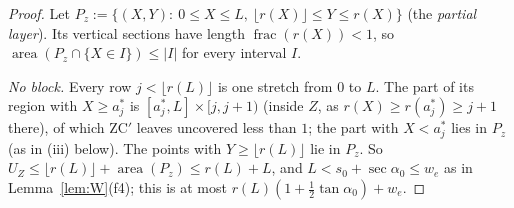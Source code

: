 \documentclass[11pt]{amsart}
\newcommand{\taz}{\tan\alpha_0}
\newcommand{\sez}{\sec\alpha_0}
\theoremstyle{definition}
\theoremstyle{remark}
\numberwithin{equation}{section}
\begin{document}
\begin{proof}
Let $P_z:=\{(X,Y):\ 0\le X\le L,\ \lfloor r(X)\rfloor\le Y\le r(X)\}$ (the \emph{partial layer}). Its vertical sections
have length $\operatorname{frac}(r(X))<1$, so $\operatorname{area}(P_z\cap\{X\in I\})\le|I|$ for every interval $I$.

\emph{No block.} Every row $j<\lfloor r(L)\rfloor$ is one stretch from $0$ to $L$. The part of its region with
$X\ge a_j^*$ is $[a_j^*,L]\times[j,j+1)$ (inside $Z$, as $r(X)\ge r(a_j^*)\ge j+1$ there), of which ZC$'$ leaves
uncovered less than $1$; the part with $X<a_j^*$ lies in $P_z$ (as in (iii) below). The points with
$Y\ge\lfloor r(L)\rfloor$ lie in $P_z$. So $U_Z\le\lfloor r(L)\rfloor+\operatorname{area}(P_z)\le r(L)+L$, and
$L<s_0+\sez\le w_e$ as in Lemma~\ref{lem:W}(f4); this is at most $r(L)(1+\frac12\taz)+w_e$.


\end{proof}
\end{document}
